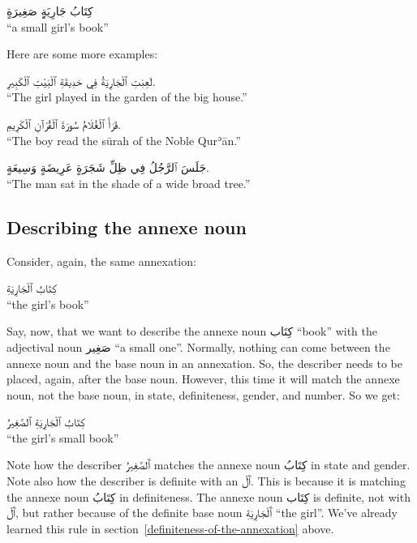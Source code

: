 \documentclass[
  10pt,
]{book}
\begin{document}
\foreignlanguage{arabic}{کِتَابُ جَارِيَةٍِ صَغِيرَةٍ}\\
\enquote{a small girl's book}

Here are some more examples:

\foreignlanguage{arabic}{لَعِبَتِ ٱلْجَارِيَةُ فِي حَدِيقَةِ ٱلْبَيْتِ ٱلْکَبِيرِ.}\\
\enquote{The girl played in the garden of the big house.}

\foreignlanguage{arabic}{قَرَأَ ٱلْغُلَامُ سُورَةَ ٱلْقُرْآنِ ٱلْکَرِيمِ.}\\
\enquote{The boy read the sūrah of the Noble Qurʾān.}

\foreignlanguage{arabic}{جَلَسَ ٱلرَّجُلُ فِي ظِلِّ شَجَرَةٍ عَرِيضَةٍ وَسِيعَةٍ.}\\
\enquote{The man sat in the shade of a wide broad tree.}

\subsection{Describing the annexe noun}\label{describing-the-annexe-noun}

Consider, again, the same annexation:

\foreignlanguage{arabic}{کِتَابُ ٱلْجَارِيَةِ}\\
\enquote{the girl's book}

Say, now, that we want to describe the annexe noun \foreignlanguage{arabic}{کِتَاب} \enquote{book} with the adjectival noun \foreignlanguage{arabic}{صَغِير} \enquote{a small one}. Normally, nothing can come between the annexe noun and the base noun in an annexation. So, the describer needs to be placed, again, after the base noun.
However, this time it will match the annexe noun, not the base noun, in state, definiteness, gender, and number. So we get:

\foreignlanguage{arabic}{کِتَابُ ٱلْجَارِيَةِ ٱلصَّغِيرُ}\\
\enquote{the girl's small book}

Note how the describer
\foreignlanguage{arabic}{ٱَلصَّغِيرُ} matches the annexe noun \foreignlanguage{arabic}{کِتَابُ} in state and gender.
Note also how the describer is definite with an \foreignlanguage{arabic}{ٱَلْ}. This is because it is matching the annexe noun \foreignlanguage{arabic}{کِتَابُ} in definiteness.
The annexe noun \foreignlanguage{arabic}{کِتَاب} is definite, not with \foreignlanguage{arabic}{ٱَلْ}, but rather because of the definite base noun \foreignlanguage{arabic}{ٱَلْجَارِيَةِ} \enquote{the girl}.
We've already learned this rule in
section~\ref{definiteness-of-the-annexation}
above.
\end{document}
